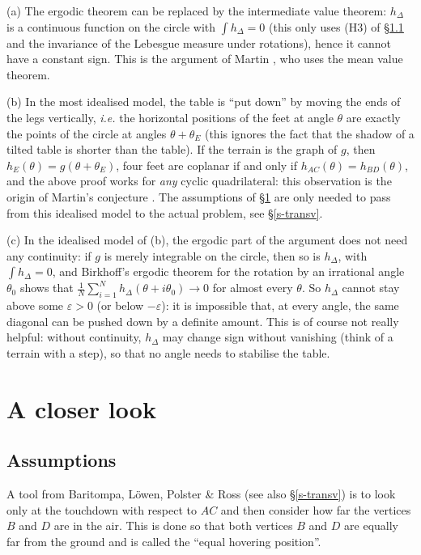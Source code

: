 \documentclass[a4paper,11pt,twoside,leqno]{article}
\newcommand{\ie}[0]{\emph{i.e.} }
\newcommand{\eps}[0]{\varepsilon}
\numberwithin{equation}{section}
\begin{document}
\begin{rmk}\label{rmk-ivt}
(a) The ergodic theorem can be replaced by the intermediate value theorem: $h_\Delta$ is a continuous function on the circle with $\int h_\Delta = 0$ (this only uses (H3) of \S{}\ref{stouchdown} and the invariance of the Lebesgue measure under rotations), hence it cannot have a constant sign. This is the argument of Martin \cite[\S{}4]{Mar}, who uses the mean value theorem.

(b) In the most idealised model, the table is ``put down'' by moving the ends of the legs vertically, \ie the horizontal positions of the feet at angle $\theta$ are exactly the points of the circle at angles $\theta + \theta_E$ (this ignores the fact that the shadow of a tilted table is shorter than the table). If the terrain is the graph of $g$, then $h_E(\theta) = g(\theta + \theta_E)$, four feet are coplanar if and only if $h_{AC}(\theta) = h_{BD}(\theta)$, and the above proof works for \emph{any} cyclic quadrilateral: this observation is the origin of Martin's conjecture \cite[\S{}4]{Mar}. The assumptions of \S{}\ref{slook} are only needed to pass from this idealised model to the actual problem, see \S{}\ref{s-transv}.

(c) In the idealised model of (b), the ergodic part of the argument does not need any continuity: if $g$ is merely integrable on the circle, then so is $h_\Delta$, with $\int h_\Delta = 0$, and Birkhoff's ergodic theorem for the rotation by an irrational angle $\theta_0$ shows that $\frac{1}{N} \sum_{i=1}^N h_\Delta(\theta + i \theta_0) \to 0$ for almost every $\theta$. So $h_\Delta$ cannot stay above some $\eps > 0$ (or below $-\eps$): it is impossible that, at every angle, the same diagonal can be pushed down by a definite amount. This is of course not really helpful: without continuity, $h_\Delta$ may change sign without vanishing (think of a terrain with a step), so that no angle needs to stabilise the table.
\end{rmk}

\section{A closer look}\label{slook}

\subsection{Assumptions}\label{stouchdown}

A tool from Baritompa, L\"owen, Polster \& Ross \cite[\S{}3]{BLPR} (see also \S{}\ref{s-transv}) is to look only at the touchdown with respect to $AC$ and then consider how far the vertices $B$ and $D$ are in the air. This is done so that both vertices $B$ and $D$ are equally far from the ground and is called the ``equal hovering position''.
\end{document}
